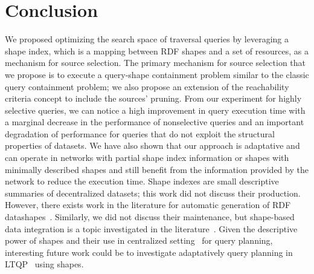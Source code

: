\section{Conclusion}

We proposed optimizing the search space of traversal queries by leveraging a shape index, which is a mapping between RDF shapes and a set of resources, as a mechanism for source selection.
The primary mechanism for source selection that we propose is to execute a query-shape containment problem similar to the classic query containment problem; we also 
propose an extension of the reachability criteria concept to include the sources' pruning.
From our experiment for highly selective queries, we can notice a high improvement in query execution time with a marginal decrease in the performance of nonselective queries 
and an important degradation of performance for queries that do not exploit the structural properties of datasets.
We have also shown that our approach is adaptative and can operate in networks with partial shape index information or shapes with minimally described shapes and still benefit
from the information provided by the network to reduce the execution time.
Shape indexes are small descriptive summaries of decentralized datasets; this work did not discuss their production.
However, there exists work in the literature for automatic generation of RDF datashapes~\cite{fernandez2023extracting}.
Similarly, we did not discuss their maintenance, but shape-based data integration is a topic investigated in the literature~\cite {LabraGayo2023}.
Given the descriptive power of shapes and their use in centralized setting~\cite{kashif2021} for query planning, interesting future work could be to investigate adaptatively
query planning in LTQP~\cite{taelman2024towards} using shapes.   